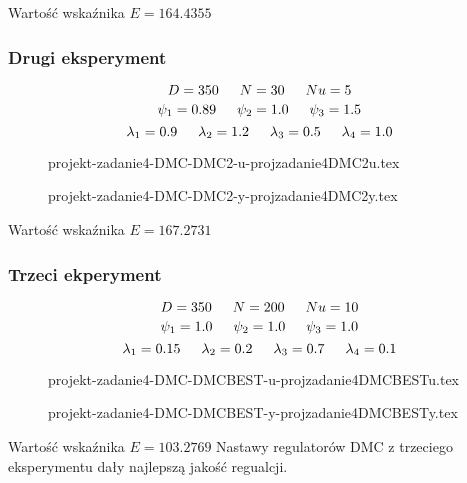 Wartość wskaźnika $E=\num{164.4355}$

\subsubsection{Drugi eksperyment}

$$D=350 \indent  N=30 \indent  Nu=5$$ 
$$\psi_1=\num{0.89} \indent \psi_2=\num{1.0} \indent \psi_3=\num{1.5}$$
$$\lambda_1=\num{0.9} \indent \lambda_2=\num{1.2} \indent \lambda_3=\num{0.5} \indent \lambda_4=\num{1.0}$$


\ifdefined\CompileFigures
    \begin{figure}[H] 
        \centering
        
        \caption{projekt-zadanie4-DMC-DMC2-u-projzadanie4DMC2u.tex}
        \label{projekt:zad4:figure:projzadanie4DMC2u}
\end{figure}
\fi

\ifdefined\CompileFigures
    \begin{figure}[H] 
        \centering
        
        \caption{projekt-zadanie4-DMC-DMC2-y-projzadanie4DMC2y.tex}
        \label{projekt:zad4:figure:projzadanie4DMC2y}
    \end{figure}
\fi

Wartość wskaźnika $E=\num{167.2731}$

\subsubsection{Trzeci ekperyment}

$$D=350 \indent  N=200 \indent  Nu=10$$ 
$$\psi_1=\num{1.0} \indent \psi_2=\num{1.0} \indent \psi_3=\num{1.0}$$
$$\lambda_1=\num{0.15} \indent \lambda_2=\num{0.2} \indent \lambda_3=\num{0.7} \indent \lambda_4=\num{0.1}$$


\ifdefined\CompileFigures
    \begin{figure}[H] 
        \centering
        
        \caption{projekt-zadanie4-DMC-DMCBEST-u-projzadanie4DMCBESTu.tex}
        \label{projekt:zad4:figure:projzadanie4DMCBESTu}
    \end{figure}
\fi

\ifdefined\CompileFigures
    \begin{figure}[H] 
        \centering
        
        \caption{projekt-zadanie4-DMC-DMCBEST-y-projzadanie4DMCBESTy.tex}
        \label{projekt:zad4:figure:projzadanie4DMCBESTy}
    \end{figure}
\fi

Wartość wskaźnika $E=\num{103.2769}$
\newline
Nastawy regulatorów DMC z trzeciego eksperymentu dały najlepszą jakość regualcji.

\newpage
